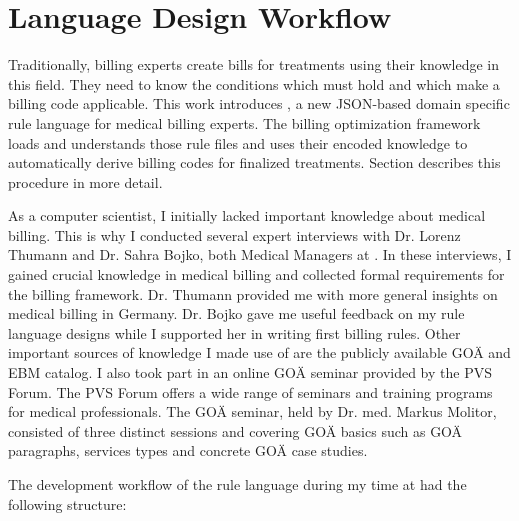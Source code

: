 \section{Language Design Workflow}\label{sec:language-design-workflow}
Traditionally, billing experts create bills for treatments using their knowledge in this field.
They need to know the conditions which must hold and which make a billing code applicable.
This work introduces \RL, a new JSON-based domain specific rule language for medical billing experts.
The billing optimization framework loads and understands those rule files and uses their encoded knowledge to automatically derive billing codes for finalized treatments.
Section  describes this procedure in more detail.

As a computer scientist, I initially lacked important knowledge about medical billing.
This is why I conducted several expert interviews with Dr. Lorenz Thumann and Dr. Sahra Bojko, both Medical Managers at \AV.
In these interviews, I gained crucial knowledge in medical billing and collected formal requirements for the billing framework.
Dr. Thumann provided me with more general insights on medical billing in Germany.
Dr. Bojko gave me useful feedback on my rule language designs while I supported her in writing first billing rules.
Other important sources of knowledge I made use of are the publicly available GOÄ and EBM catalog.
I also took part in an online GOÄ seminar provided by the PVS Forum.
The PVS Forum offers a wide range of seminars and training programs for medical professionals.
The GOÄ seminar, held by Dr. med. Markus Molitor,
consisted of three distinct sessions and covering GOÄ basics such as GOÄ paragraphs, services types and concrete GOÄ case studies.

The development workflow of the rule language during my time at \AV had the following structure:

